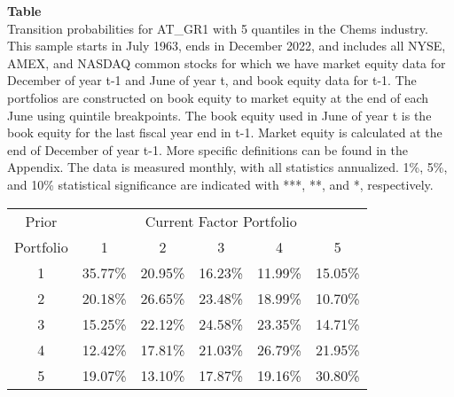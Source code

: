 \begin{table*}[ht!]
\raggedright
{}
\label{tab: transition_probs_AT_GR1_Chems_with_5_quantiles}
\textbf{Table \thetable} \\
Transition probabilities for AT_GR1 with 5 quantiles in the Chems industry. \\
\hspace*{1em}This sample starts in July 1963, ends in December 2022, and includes all NYSE, AMEX, and NASDAQ common stocks for which we have market equity data for December of year t-1 and June of year t, and book equity data for t-1. The portfolios are constructed on book equity to market equity at the end of each June using quintile breakpoints.  The book equity used in June of year t is the book equity for the last fiscal year end in t-1.  Market equity is calculated at the end of December of year t-1.  More specific definitions can be found in the Appendix.  The data is measured monthly, with all statistics annualized.  1\%, 5\%, and 10\% statistical significance are indicated with ***, **, and *, respectively. \\
\vspace{0.5em}
\centering
\begin{adjustbox}{max width=\textwidth}
\begin{tabular}{@{}cccccc@{}}
\toprule
Prior & \multicolumn{5}{c}{Current Factor Portfolio} \\
Portfolio & 1 & 2 & 3 & 4 & 5 \\
\midrule
1 & 35.77\% & 20.95\% & 16.23\% & 11.99\% & 15.05\% \\
2 & 20.18\% & 26.65\% & 23.48\% & 18.99\% & 10.70\% \\
3 & 15.25\% & 22.12\% & 24.58\% & 23.35\% & 14.71\% \\
4 & 12.42\% & 17.81\% & 21.03\% & 26.79\% & 21.95\% \\
5 & 19.07\% & 13.10\% & 17.87\% & 19.16\% & 30.80\% \\
\bottomrule
\end{tabular}
\end{adjustbox}
\end{table*}